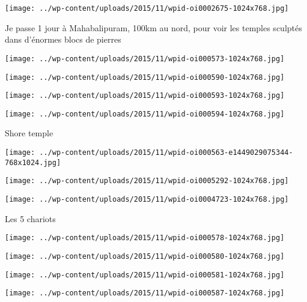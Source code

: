  \newline
\centerline{\texttt{[image: ../wp-content/uploads/2015/11/wpid-oi0002675-1024x768.jpg]} } 
 \newline
 Je passe 1 jour à Mahabalipuram, 100km au nord, pour voir les temples sculptés dans d'énormes blocs de pierres \newline
 \newline
\centerline{\texttt{[image: ../wp-content/uploads/2015/11/wpid-oi000573-1024x768.jpg]} } 
 \newline
 \newline
\centerline{\texttt{[image: ../wp-content/uploads/2015/11/wpid-oi000590-1024x768.jpg]} } 
 \newline
 \newline
\centerline{\texttt{[image: ../wp-content/uploads/2015/11/wpid-oi000593-1024x768.jpg]} } 
 \newline
 \newline
\centerline{\texttt{[image: ../wp-content/uploads/2015/11/wpid-oi000594-1024x768.jpg]} } 
 \newline
 Shore temple \newline
 \newline
\centerline{\texttt{[image: ../wp-content/uploads/2015/11/wpid-oi000563-e1449029075344-768x1024.jpg]} } 
 \newline
 \newline
\centerline{\texttt{[image: ../wp-content/uploads/2015/11/wpid-oi0005292-1024x768.jpg]} } 
 \newline
 \newline
\centerline{\texttt{[image: ../wp-content/uploads/2015/11/wpid-oi0004723-1024x768.jpg]} } 
 \newline
 Les 5 chariots \newline
 \newline
\centerline{\texttt{[image: ../wp-content/uploads/2015/11/wpid-oi000578-1024x768.jpg]} } 
 \newline
 \newline
\centerline{\texttt{[image: ../wp-content/uploads/2015/11/wpid-oi000580-1024x768.jpg]} } 
 \newline
 \newline
\centerline{\texttt{[image: ../wp-content/uploads/2015/11/wpid-oi000581-1024x768.jpg]} } 
 \newline
 \newline
\centerline{\texttt{[image: ../wp-content/uploads/2015/11/wpid-oi000587-1024x768.jpg]} } 

